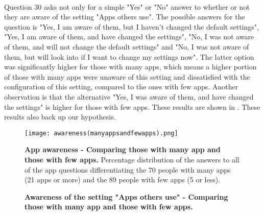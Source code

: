 \paragraph{}
Question 30 asks not only for a simple "Yes" or "No" answer to whether or not they are aware of the setting "Apps others use". The possible answers for the question is "Yes, I am aware of them, but I haven't changed the default settings", "Yes, I am aware of them, and have changed the settings", "No, I was not aware of them, and will not change the default settings" and "No, I was not aware of them, but will look into if I want to change my settings now". The latter option was significantly higher for those with many apps, which means a higher portion of those with many apps were unaware of this setting and dissatisfied with the configuration of this setting, compared to the ones with few apps. Another observation is that the alternative "Yes, I was aware of them, and have changed the settings" is higher for those with few apps. These results are shown in . These results also back up our hypothesis. 

\begin{figure}[h!]
\centering
\texttt{[image: awareness(manyappsandfewapps).png]}
\caption[App awareness - Comparing those with many app and those with few apps]{\textbf{App awareness - Comparing those with many app and those with few apps.} Percentage distribution of the answers to all of the app questions differentiating the 70 people with many apps (21 apps or more) and the 89 people with few apps (5 or less).} 
\label{fig:manyappsandfewapps}
\end{figure}

\begin{figure}[h!]
\centering
{}
\caption[Awareness of the setting "Apps others use" - Comparing those with many app and those with few apps]{\textbf{Awareness of the setting "Apps others use" - Comparing those with many app and those with few apps.}} 
\label{fig:appsothersusemanyfew}
\end{figure}
